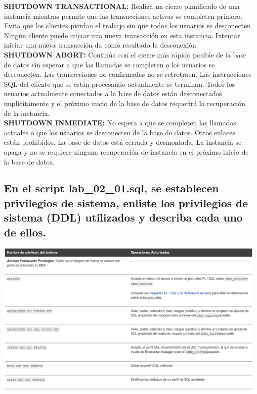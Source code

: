 \documentclass[12pt,letterpaper]{article}
\begin{document}
\textbf{SHUTDOWN TRANSACTIONAL:} Realiza un cierre planificado de una instancia mientras permite que las transacciones activas se completen primero. Evita que los clientes pierdan el trabajo sin que todos los usuarios se desconecten. Ningún cliente puede iniciar una nueva transacción en esta instancia. Intentar iniciar una nueva transacción da como resultado la desconexión. 
\vspace{10pt}\\
\textbf{SHUTDOWN ABORT:} Continúa con el cierre más rápido posible de la base de datos sin esperar a que las llamadas se completen o los usuarios se desconecten. Las transacciones no confirmadas no se retrotraen. Las instrucciones SQL del cliente que se están procesando actualmente se terminan. Todos los usuarios actualmente conectados a la base de datos están desconectados implícitamente y el próximo inicio de la base de datos requerirá la recuperación de la instancia.
\vspace{10pt}\\
\textbf{SHUTDOWN INMEDIATE:} No espera a que se completen las llamadas actuales o que los usuarios se desconecten de la base de datos. Otros enlaces están prohibidos. La base de datos está cerrada y desmontada. La instancia se apaga y no se requiere ninguna recuperación de instancia en el próximo inicio de la base de datos.\\
\break


\subsection{En el script lab\_02\_01.sql, se establecen privilegios de sistema, enliste los privilegios de sistema (DDL) utilizados y describa cada uno de ellos.}
\vspace{12pt}
\begin{center}
  \includegraphics[width=14cm]{Imagenes/Privilegios_sistema.png}\\
\end{center}
\end{document}
